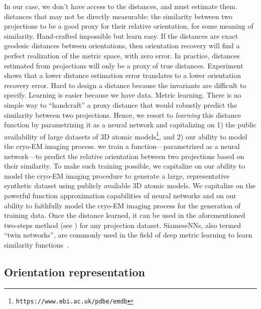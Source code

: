 In our case, we don't have access to the distances, and must estimate them.
distances that may not be directly measurable:
the similarity between two projections to be a good proxy for their relative orientation, for some meaning of similarity.
Hand-crafted impossible but learn easy.
If the distances are exact geodesic distances between orientations, then orientation recovery will find a perfect realization of the metric space, with zero error.
In practice, distances estimated from projections will only be a proxy of true distances.
Experiment  shows that a lower distance estimation error translates to a lower orientation recovery error.
Hard to design a distance because the invariants are difficult to specify. Learning is easier because we have data.
Metric learning.
There is no simple way to ``handcraft'' a proxy distance that would robustly predict the similarity between two projections.
Hence, we resort to \textit{learning} this distance function by parametrizing it as a neural network and capitalizing on 1) the public availability of large datasets of 3D atomic models\footnote{\texttt{https://www.ebi.ac.uk/pdbe/emdb}}, and 2) our ability to model the cryo-EM imaging process.
we train a function---parametrized as a neural network---to predict the relative orientation between two projections based on their similarity.
To make such training possible, we capitalize on our ability to model the cryo-EM imaging procedure to generate a large, representative synthetic dataset using publicly available 3D atomic models.
We capitalize on the powerful function approximation capabilities of neural networks and on our ability to faithfully model the cryo-EM imaging process for the generation of training data.
Once the distance learned, it can be used in the aforementioned two-steps method (see ) for any projection dataset.
SiameseNNs, also termed ``twin networks'', are commonly used in the field of deep metric learning to learn similarity functions~\cite{yi2014deep}.

\subsection{Orientation representation}\label{sec:method:orientation-representation}

